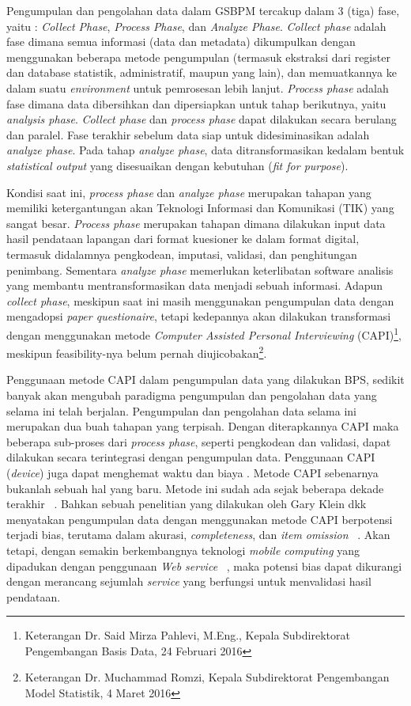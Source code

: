Pengumpulan dan pengolahan data dalam GSBPM tercakup dalam 3 (tiga) fase, yaitu : \textit{Collect Phase}, \textit{Process Phase}, dan \textit{Analyze Phase}. \textit{Collect phase} adalah fase dimana semua informasi (data dan metadata) dikumpulkan dengan menggunakan beberapa metode pengumpulan (termasuk ekstraksi dari register dan database statistik, administratif, maupun yang lain), dan memuatkannya ke dalam suatu \textit{environment} untuk pemrosesan lebih lanjut. \textit{Process phase} adalah fase dimana data dibersihkan dan dipersiapkan untuk tahap berikutnya, yaitu \textit{analysis phase}. \textit{Collect phase} dan \textit{process phase} dapat dilakukan secara berulang dan paralel. Fase terakhir sebelum data siap untuk didesiminasikan adalah \textit{analyze phase}. Pada tahap \textit{analyze phase}, data ditransformasikan kedalam bentuk \textit{statistical output} yang disesuaikan dengan kebutuhan (\textit{fit for purpose}).

Kondisi saat ini, \textit{process phase} dan \textit{analyze phase} merupakan tahapan yang memiliki ketergantungan akan Teknologi Informasi dan Komunikasi (TIK) yang sangat besar. \textit{Process phase} merupakan tahapan dimana dilakukan input data hasil pendataan lapangan dari format kuesioner ke dalam format digital, termasuk didalamnya pengkodean, imputasi, validasi, dan penghitungan penimbang. Sementara \textit{analyze phase} memerlukan keterlibatan software analisis yang membantu mentransformasikan data menjadi sebuah informasi. Adapun \textit{collect phase}, meskipun saat ini masih menggunakan pengumpulan data dengan mengadopsi \textit{paper questionaire}, tetapi kedepannya akan dilakukan transformasi dengan menggunakan metode \textit{Computer Assisted Personal Interviewing} (CAPI)\footnote{Keterangan Dr. Said Mirza Pahlevi, M.Eng., Kepala Subdirektorat Pengembangan Basis Data, 24 Februari 2016}, meskipun feasibility-nya belum pernah diujicobakan\footnote{Keterangan Dr. Muchammad Romzi, Kepala Subdirektorat Pengembangan Model Statistik, 4 Maret 2016}. 

Penggunaan metode CAPI dalam pengumpulan data yang dilakukan BPS, sedikit banyak akan mengubah paradigma pengumpulan dan pengolahan data yang selama ini telah berjalan. Pengumpulan dan pengolahan data selama ini merupakan dua buah tahapan yang terpisah. Dengan diterapkannya CAPI maka beberapa sub-proses dari \textit{process phase}, seperti pengkodean dan validasi, dapat dilakukan secara terintegrasi dengan pengumpulan data. Penggunaan CAPI (\textit{device}) juga dapat menghemat waktu dan biaya \cite{wright_researching_2005}. Metode CAPI sebenarnya bukanlah sebuah hal yang baru. Metode ini sudah ada sejak beberapa dekade terakhir ~\cite{_redesigning_????}. Bahkan sebuah penelitian yang dilakukan oleh Gary Klein dkk menyatakan pengumpulan data dengan menggunakan metode CAPI berpotensi terjadi bias, terutama dalam akurasi, \textit{completeness}, dan \textit{item omission} ~\cite{klein_bias_1996}. Akan tetapi, dengan semakin berkembangnya teknologi \textit{mobile computing} yang dipadukan dengan penggunaan \textit{Web service} ~\cite{tergujeff_mobile_2007}, maka potensi bias dapat dikurangi dengan merancang sejumlah \textit{service} yang berfungsi untuk menvalidasi hasil pendataan.

